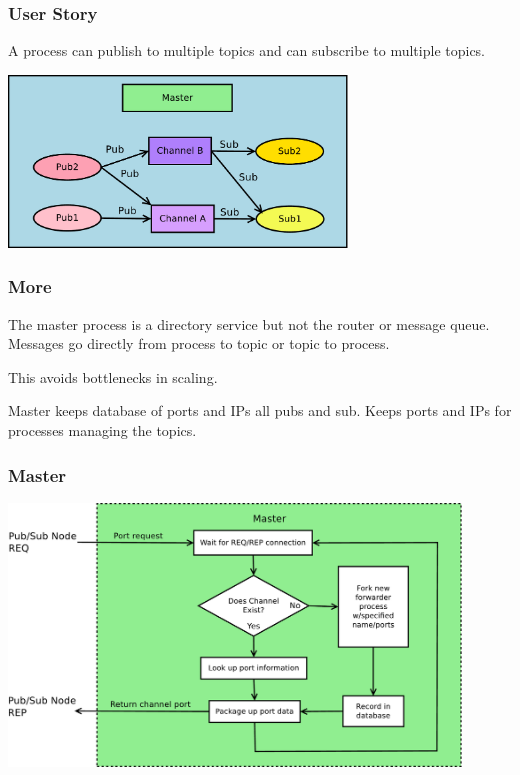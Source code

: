 \documentclass[xcolor=svgnames]{beamer}
\begin{document}
\begin{frame}[fragile]
  \frametitle{User Story}
  
A process can publish to multiple topics and can subscribe to multiple 
topics.
\begin{center}
\includegraphics[width=9cm]{./Diagram13b.pdf}
\end{center}
\end{frame}


\begin{frame}[fragile]
  \frametitle{More}


The master process is a directory service but not the router or message 
queue.  Messages go directly from process to topic or topic to process.
\vfill


This avoids bottlenecks in scaling.\vfill

Master keeps database of ports and IPs all pubs and sub.   Keeps 
ports and IPs for processes managing the topics.


\end{frame}


\begin{frame}[fragile]
  \frametitle{Master}
\begin{center}
\includegraphics[width=12cm]{./Diagram14.pdf}
\end{center}
\end{frame}
\end{document}
